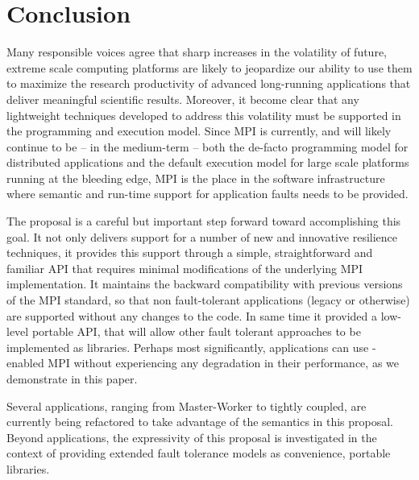 \section{Conclusion}
\label{sect:conclusion}

Many responsible voices agree that sharp increases in the volatility of future,
extreme scale computing platforms are likely to jeopardize our ability to use
them to maximize the research productivity of advanced long-running applications
that deliver meaningful scientific results. Moreover, it become clear that any
lightweight techniques developed to address this volatility must be supported in the
programming and execution model. Since MPI is currently, and will likely
continue to be -- in the medium-term -- both the de-facto programming model for
distributed applications and the default execution model for large scale
platforms running at the bleeding edge, MPI is the place in the software
infrastructure where semantic and run-time support for application faults needs
to be provided.

The \ulfm proposal is a careful but important step forward toward accomplishing
this goal.  It not only delivers support for a number of new and innovative
resilience techniques, it provides this support through a simple,
straightforward and familiar API that requires minimal modifications of the
underlying MPI implementation. It maintains the backward compatibility with
previous versions of the MPI standard, so that non fault-tolerant applications
(legacy or otherwise) are supported without any changes to the code. In same
time it provided a low-level portable API, that will allow other fault tolerant
approaches to be implemented as libraries. Perhaps most significantly,
applications can use \ulfm-enabled MPI without experiencing any degradation in
their performance, as we demonstrate in this paper.

Several applications, ranging from Master-Worker to tightly coupled, are
currently being refactored to take advantage of the semantics in this
proposal. Beyond applications, the expressivity of this proposal is 
investigated in the context of providing extended fault tolerance 
models as convenience, portable libraries.
